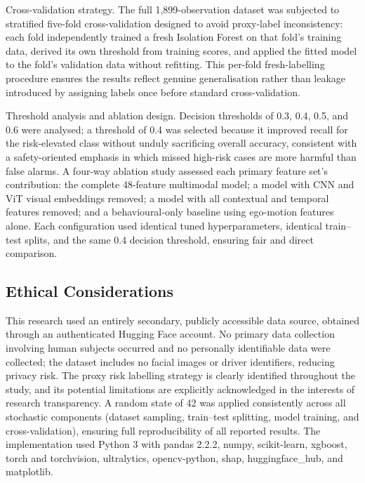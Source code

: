 \documentclass[11pt,a4paper]{article}
\begin{document}
Cross-validation strategy. The full 1,899-observation dataset was subjected to stratified five-fold cross-validation designed to avoid proxy-label inconsistency: each fold independently trained a fresh Isolation Forest on that fold's training data, derived its own threshold from training scores, and applied the fitted model to the fold's validation data without refitting. This per-fold fresh-labelling procedure ensures the results reflect genuine generalisation rather than leakage introduced by assigning labels once before standard cross-validation.

Threshold analysis and ablation design. Decision thresholds of 0.3, 0.4, 0.5, and 0.6 were analysed; a threshold of 0.4 was selected because it improved recall for the risk-elevated class without unduly sacrificing overall accuracy, consistent with a safety-oriented emphasis in which missed high-risk cases are more harmful than false alarms. A four-way ablation study assessed each primary feature set's contribution: the complete 48-feature multimodal model; a model with CNN and ViT visual embeddings removed; a model with all contextual and temporal features removed; and a behavioural-only baseline using ego-motion features alone. Each configuration used identical tuned hyperparameters, identical train--test splits, and the same 0.4 decision threshold, ensuring fair and direct comparison.

\subsection{Ethical Considerations}

This research used an entirely secondary, publicly accessible data source, obtained through an authenticated Hugging Face account. No primary data collection involving human subjects occurred and no personally identifiable data were collected; the dataset includes no facial images or driver identifiers, reducing privacy risk. The proxy risk labelling strategy is clearly identified throughout the study, and its potential limitations are explicitly acknowledged in the interests of research transparency. A random state of 42 was applied consistently across all stochastic components (dataset sampling, train--test splitting, model training, and cross-validation), ensuring full reproducibility of all reported results. The implementation used Python 3 with pandas 2.2.2, numpy, scikit-learn, xgboost, torch and torchvision, ultralytics, opencv-python, shap, huggingface\_hub, and matplotlib.
\end{document}
